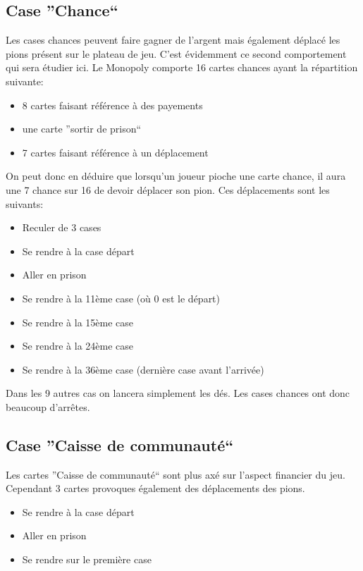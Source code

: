 \documentclass[letterpaper]{article}
\begin{document}
  \subsection{Case ''Chance``}
    Les cases chances peuvent faire gagner de l'argent mais également déplacé les pions 
    présent sur le plateau de jeu.  C'est évidemment ce second comportement qui sera
    étudier ici.  Le Monopoly comporte 16 cartes chances ayant la répartition suivante:
    \begin{itemize}
     \item 8 cartes faisant référence à des payements
     \item une carte ''sortir de prison``
     \item 7 cartes faisant référence à un déplacement
    \end{itemize}
    On peut donc en déduire que lorsqu'un joueur pioche une carte chance, il aura une 
    7 chance sur 16 de devoir déplacer son pion.  Ces déplacements sont les suivants:
    \begin{itemize}
     \item Reculer de 3 cases
     \item Se rendre à la case départ
     \item Aller en prison
     \item Se rendre à la 11ème case (où 0 est le départ)
     \item Se rendre à la 15ème case
     \item Se rendre à la 24ème case
     \item Se rendre à la 36ème case (dernière case avant l'arrivée)
    \end{itemize}
    Dans les 9 autres cas on lancera simplement les dés.  Les cases chances ont donc 
    beaucoup d'arrêtes.
    
  \subsection{Case ''Caisse de communauté``}
    Les cartes ''Caisse de communauté`` sont plus axé sur l'aspect financier du jeu.
    Cependant 3 cartes provoques également des déplacements des pions.
    \begin{itemize}
     \item Se rendre à la case départ
     \item Aller en prison
     \item Se rendre sur le première case
    \end{itemize}
    
\end{document}
